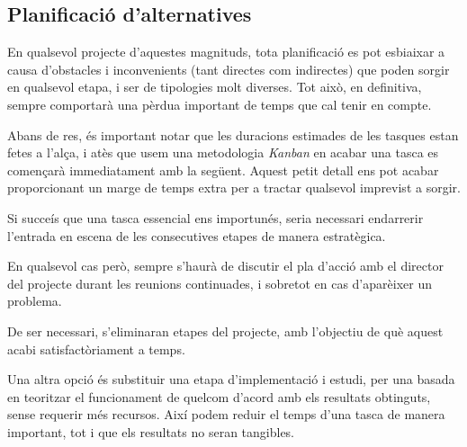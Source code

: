 \documentclass[a4paper]{report}
\begin{document}
	\subsection{Planificació d'alternatives}
	En qualsevol projecte d'aquestes magnituds, tota planificació es pot esbiaixar a causa d'obstacles i inconvenients (tant directes com indirectes) que poden sorgir en qualsevol etapa, i ser de tipologies molt diverses. Tot això, en definitiva, sempre comportarà una pèrdua important de temps que cal tenir en compte. \par
	Abans de res, és important notar que les duracions estimades de les tasques estan fetes a l'alça, i atès que usem una metodologia \textit{Kanban} en acabar una tasca es començarà immediatament amb la següent. Aquest petit detall ens pot acabar proporcionant un marge de temps extra per a tractar qualsevol imprevist a sorgir.\par
	Si succeís que una tasca essencial ens importunés, seria necessari endarrerir l'entrada en escena de les consecutives etapes de manera estratègica. \par
	En qualsevol cas però, sempre s'haurà de discutir el pla d'acció amb el director del projecte durant les reunions continuades, i sobretot en cas d'aparèixer un problema.\par
	De ser necessari, s'eliminaran etapes del projecte, amb l'objectiu de què aquest acabi satisfactòriament a temps. \par
	Una altra opció és substituir una etapa d'implementació i estudi, per una basada en teoritzar el funcionament de quelcom d'acord amb els resultats obtinguts, sense requerir més recursos. Així podem reduir el temps d'una tasca de manera important, tot i que els resultats no seran tangibles.
	
	\newpage
	
	\renewcommand{\bibname}{Referències}
	
	 
	
	
	\newpage
	
	
	
\end{document}
